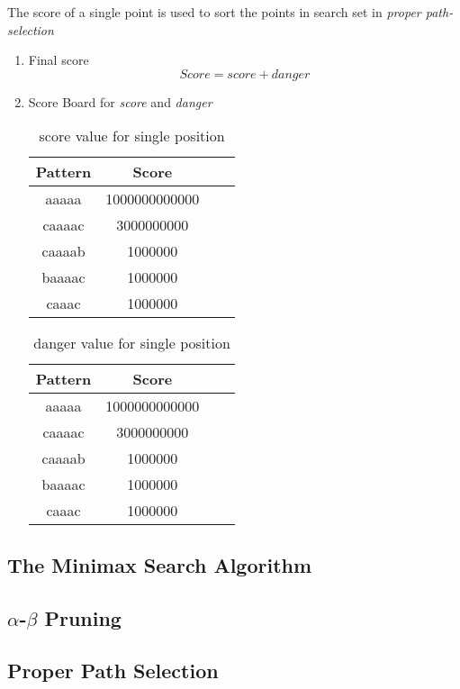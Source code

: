 \documentclass[conference]{IEEEtran}
\begin{document}
The score of a single point is used to sort the points in search set in \emph{proper path-selection}
\begin{enumerate}
	\item Final score
	$$Score = score + danger$$
	\item Score Board for \emph{score} and \emph{danger}
	
	\begin{table}[htb]
	\caption{score value for single position}
	\centering
    \begin{tabular}{cccc}
    \toprule
    Pattern&Score\\
    \midrule
	aaaaa&1000000000000\\
	caaaac&3000000000\\
	caaaab&1000000\\
	baaaac&1000000\\
	caaac&1000000\\
	\bottomrule
	\end{tabular}
	\label{table:1}
	\end{table}
	

	\begin{table}[htb]
	\caption{danger value for single position}
	\centering
    \begin{tabular}{cccc}
    \toprule
    Pattern&Score\\
    \midrule
	aaaaa&1000000000000\\
	caaaac&3000000000\\
	caaaab&1000000\\
	baaaac&1000000\\
	caaac&1000000\\
	\bottomrule
	\end{tabular}
	\label{table:1}
	\end{table}
	
\end{enumerate}

\subsection{The Minimax Search Algorithm}
\subsection{$\alpha$-$\beta$ Pruning}
\subsection{Proper Path Selection}
\end{document}
